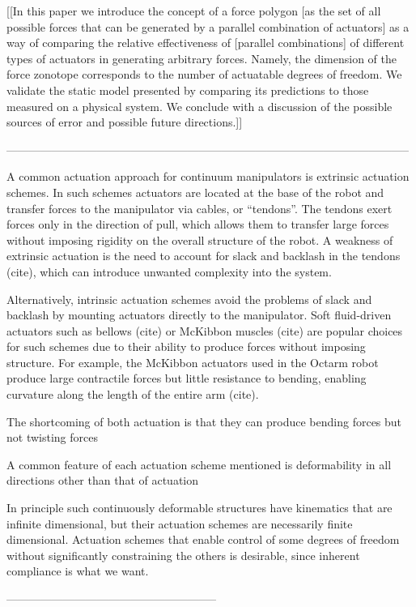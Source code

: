 [[In this paper we introduce the concept of a force polygon [as the set of all possible forces that can be generated by a parallel combination of actuators] as a way of comparing the relative effectiveness of [parallel combinations] of different types of actuators in generating arbitrary forces. Namely, the dimension of the force zonotope corresponds to the number of actuatable degrees of freedom. We validate the static model presented by comparing its predictions to those measured on a physical system. We conclude with a discussion of the possible sources of error and possible future directions.]]


-----------------------------------------------------------------------------------------------------------

A common actuation approach for continuum manipulators is extrinsic actuation schemes. In such schemes actuators are located at the base of the robot and transfer forces to the manipulator via cables, or ``tendons''. The tendons exert forces only in the direction of pull, which allows them to transfer large forces without imposing rigidity on the overall structure of the robot. A weakness of extrinsic actuation is the need to account for slack and backlash in the tendons (cite), which can introduce unwanted complexity into the system.

Alternatively, intrinsic actuation schemes avoid the problems of slack and backlash by mounting actuators directly to the manipulator. Soft fluid-driven actuators such as bellows (cite) or McKibbon muscles (cite) are popular choices for such schemes due to their ability to produce forces without imposing structure. For example, the McKibbon actuators used in the Octarm robot produce large contractile forces but little resistance to bending, enabling curvature along the length of the entire arm (cite).

The shortcoming of both actuation is that they can produce bending forces but not twisting forces


A common feature of each actuation scheme mentioned is deformability in all directions other than that of actuation


In principle such continuously deformable structures have kinematics that are infinite dimensional, but their actuation schemes are necessarily finite dimensional. Actuation schemes that enable control of some degrees of freedom without significantly constraining the others is desirable, since inherent compliance is what we want.


--------------------------------------------------------

